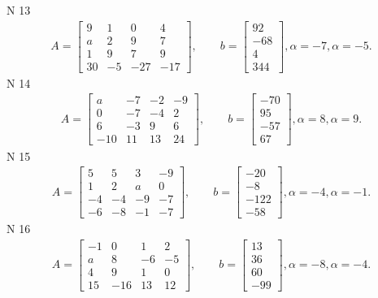 \documentclass[11pt]{report}
\begin{document}
N 13
\begin{align*}
 A = \left[\begin{matrix}9 & 1 & 0 & 4\\a & 2 & 9 & 7\\1 & 9 & 7 & 9\\30 & -5 & -27 & -17\end{matrix}\right],
    \qquad b = \left[\begin{matrix}92\\-68\\4\\344\end{matrix}\right], \alpha = -7, \alpha = -5. 
 \end{align*}
N 14
\begin{align*}
 A = \left[\begin{matrix}a & -7 & -2 & -9\\0 & -7 & -4 & 2\\6 & -3 & 9 & 6\\-10 & 11 & 13 & 24\end{matrix}\right],
    \qquad b = \left[\begin{matrix}-70\\95\\-57\\67\end{matrix}\right], \alpha = 8, \alpha = 9. 
 \end{align*}
N 15
\begin{align*}
 A = \left[\begin{matrix}5 & 5 & 3 & -9\\1 & 2 & a & 0\\-4 & -4 & -9 & -7\\-6 & -8 & -1 & -7\end{matrix}\right],
    \qquad b = \left[\begin{matrix}-20\\-8\\-122\\-58\end{matrix}\right], \alpha = -4, \alpha = -1. 
 \end{align*}
N 16
\begin{align*}
 A = \left[\begin{matrix}-1 & 0 & 1 & 2\\a & 8 & -6 & -5\\4 & 9 & 1 & 0\\15 & -16 & 13 & 12\end{matrix}\right],
    \qquad b = \left[\begin{matrix}13\\36\\60\\-99\end{matrix}\right], \alpha = -8, \alpha = -4. 
 \end{align*}
\end{document}
